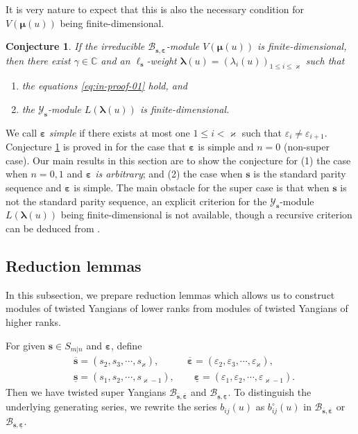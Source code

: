 \documentclass[11pt,reqno]{amsart}
\numberwithin{equation}{section}
\newtheorem{conj}[thm]{Conjecture}
\theoremstyle{definition}
\theoremstyle{remark}
\newcommand{\beq}{\begin{equation}}
\newcommand{\eeq}{\end{equation}}
\newcommand{\bC}{\mathbb{C}}
\newcommand{\lle}{\leqslant}
\newcommand{\la}{\lambda}
\newcommand{\bla}{\bm\lambda}
\newcommand{\YMN}{{\mathscr{Y}_{\bm s}}}
\newcommand{\BMN}{{\mathscr{B}_{\bm s,\bm \ve}}}
\newcommand{\ka}{\varkappa}
\newcommand{\ve}{\varepsilon}
\newcommand{\s}{{\bm s}}
\newcommand{\ovs}{{\overline{\bm s}}}
\newcommand{\ove}{{\overline{\bm \varepsilon}}}
\newcommand{\uns}{{\underline{\bm s}}}
\newcommand{\une}{{\underline{\bm \varepsilon}}}
\begin{document}
It is very nature to expect that this is also the necessary condition for $V(\bm\mu(u))$ being finite-dimensional.

\begin{conj}\label{conj:main}
If the irreducible $\BMN$-module $V(\bm \mu(u))$ is finite-dimensional, then there exist $\gamma\in \bC$ and an  $\ell_\s$-weight $\bm\la(u)=(\la_i(u))_{1\lle i\lle \ka}$ such that
\begin{enumerate}
    \item the equations \eqref{eq:in-proof-01} hold, and
    \item the $\YMN$-module $L(\bla(u))$ is finite-dimensional.
\end{enumerate}
\end{conj}

We call $\bm\ve$ {\it simple} if there exists at most one $1\lle i<\ka$ such that $\ve_i\ne \ve_{i+1}$. Conjecture \ref{conj:main} is proved in \cite{Molev2002reflection} for the case that $\bm\ve$ is simple and $n=0$ (non-super case). Our main results in this section are to show the conjecture for (1) the case when $n=0,1$ and \textit{$\bm\ve$ is arbitrary}; and (2) the case when $\s$ is the standard parity sequence and $\bm\ve$ is simple. The main obstacle for the super case is that when $\bm s$ is not the standard parity sequence, an explicit criterion for the $\YMN$-module $L(\bla(u))$ being finite-dimensional is not available, though a recursive criterion can be deduced from \cite{Molev2022odd,Lu2022note}.

\subsection{Reduction lemmas}\label{sec:reduct-lem}
In this subsection, we prepare reduction lemmas which allows us to construct modules of twisted Yangians of lower ranks from  modules of twisted Yangians of higher ranks.

For given $\bm s\in S_{m|n}$ and $\bm \ve$, define
\beq
\begin{split}
&\overline{\bm s}=(s_2,s_3,\cdots,s_\ka),\qquad \ \ \ \  \overline{\bm\ve}=(\ve_2,\ve_3,\cdots,\ve_\ka),\\
&\underline{\bm s}=(s_1,s_2,\cdots,s_{\ka-1}),\qquad \underline{\bm\ve}=(\ve_1,\ve_2,\cdots,\ve_{\ka-1}).
\end{split}
\eeq
Then we have twisted super Yangians $\mathscr B_{\ovs,\ove}$ and $\mathscr B_{\uns,\une}$. To distinguish the underlying generating series, we rewrite the series ${b}_{ij}(u)$ as ${b}^\circ_{ij}(u)$ in $\mathscr B_{\ovs,\ove}$ or $\mathscr B_{\uns,\une}$.
\end{document}

